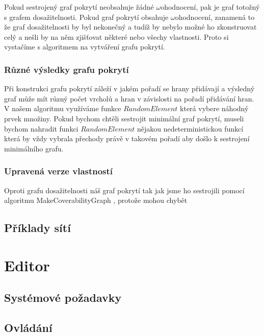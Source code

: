 \documentclass[
  biblatex,
  glossaries,
  index
]{kidiplom}
\begin{document}
Pokud sestrojený graf pokrytí neobsahuje žádné $\omega$ohodnocení,
pak je graf totožný s grafem dosažitelnosti. 
Pokud graf pokrytí obsahuje $\omega$ohodnocení, zanamená to že 
graf dosažitelnosti by byl nekonečný a tudíž by nebylo možné 
ho zkonstruovat celý a nešli by na něm zjišťovat některé nebo všechy vlastnosti.
Proto si vystačíme s algoritmem na vytváření grafu pokrytí.

\subsubsection{Různé výsledky grafu pokrytí}

Při konstrukci grafu pokrytí záleží v jakém pořadí se hrany přidávají
a výsledný graf může mít různý počet vrcholů a hran 
v závislosti na pořadí přidávání hran.
V našem algoritmu využíváme funkce $RandomElement$ která vybere 
náhodný prvek množiny. 
Pokud bychom chtěli sestrojit minimální 
graf pokrytí, museli bychom nahradit funkci $RandomElement$ nějakou
nedeterministickou funkcí která by vždy vybrala přechody právě 
v takovém pořadí aby došlo k sestrojení minimálního grafu.


\subsubsection{Upravená verze vlastností}

Oproti grafu dosažitelnosti náš graf pokrytí tak jak jsme ho sestrojili 
pomocí algoritmu MakeCoverabilityGraph , protože mohou chybět




\subsection{Příklady sítí}





\section{Editor}
\subsection{Systémové požadavky}
\subsection{Ovládání}
\end{document}
